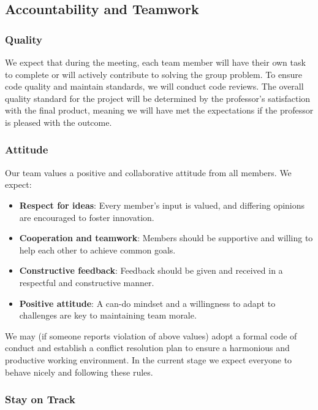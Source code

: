 \documentclass{article}
\begin{document}
\subsection*{Accountability and Teamwork}

\subsubsection*{Quality} 

We expect that during the meeting, each team member will have their own task to complete or will actively contribute to solving the group problem. To ensure code quality and maintain standards, we will conduct code reviews. The overall quality standard for the project will be determined by the professor's satisfaction with the final product, meaning we will have met the expectations if the professor is pleased with the outcome.

\subsubsection*{Attitude}

Our team values a positive and collaborative attitude from all members. We expect:
\begin{itemize}
    \item \textbf{Respect for ideas}: Every member's input is valued, and differing opinions are encouraged to foster innovation.
    \item \textbf{Cooperation and teamwork}: Members should be supportive and willing to help each other to achieve common goals.
    \item \textbf{Constructive feedback}: Feedback should be given and received in a respectful and constructive manner.
    \item \textbf{Positive attitude}: A can-do mindset and a willingness to adapt to challenges are key to maintaining team morale.
\end{itemize}
We may (if someone reports violation of above values) adopt a formal code of conduct and establish a conflict resolution plan to ensure a harmonious and productive working environment. In the current stage we expect everyone to behave nicely and following these rules.

\subsubsection*{Stay on Track}
\end{document}
